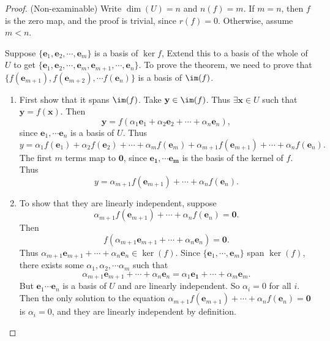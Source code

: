 \documentclass[a4paper]{article}
\begin{document}
\begin{proof}
  (Non-examinable) Write $\dim(U) = n$ and $n(f) = m$. If $m = n$, then $f$ is the zero map, and the proof is trivial, since $r(f) = 0 $. Otherwise, assume $m < n$.

  Suppose $\{\mathbf{e}_1, \mathbf{e}_2,\cdots, \mathbf{e}_m\}$ is a basis of $\ker f$, Extend this to a basis of the whole of $U$ to get $\{\mathbf{e}_1, \mathbf{e}_2, \cdots, \mathbf{e}_m, \mathbf{e}_{m+1}, \cdots, \mathbf{e}_n\}$. To prove the theorem, we need to prove that $\{f(\mathbf{e}_{m+1}), f(\mathbf{e}_{m + 2}), \cdots f({\mathbf{e}_n})\}$ is a basis of $\im (f)$.
  \begin{enumerate}
    \item First show that it spans $\im (f)$. Take $\mathbf{y}\in \im(f)$. Thus $\exists \mathbf{x}\in U$ such that $\mathbf{y} = f(\mathbf{x})$. Then
      \[
        \mathbf{y} = f(\alpha_1\mathbf{e}_1 + \alpha_2\mathbf{e}_2 + \cdots + \alpha_n \mathbf{e}_n),
      \]
      since $\mathbf{e}_1, \cdots \mathbf{e}_n$ is a basis of $U$. Thus
      \[
        y = \alpha_1f(\mathbf{e}_1) + \alpha_2f(\mathbf{e}_2) + \cdots + \alpha_m f(\mathbf{e}_m) + \alpha_{m + 1}f(\mathbf{e}_{m + 1}) + \cdots + \alpha_nf(\mathbf{e}_n).
      \]
      The first $m$ terms map to $\mathbf{0}$, since $\mathbf{e_1, \cdots e_m}$ is the basis of the kernel of $f$. Thus
      \[
        y = \alpha_{m + 1} f(\mathbf{e}_{m + 1}) + \cdots + \alpha_n f(\mathbf{e}_n).
      \]
    \item To show that they are linearly independent, suppose
      \[
        \alpha_{m + 1} f(\mathbf{e}_{m + 1}) + \cdots + \alpha_n f(\mathbf{e}_n) = \mathbf{0}.
      \]
      Then
      \[
        f(\alpha_{m + 1}\mathbf{e}_{m + 1} + \cdots + \alpha_n\mathbf{e}_n) = \mathbf{0}.
      \]
      Thus $\alpha_{m + 1}\mathbf{e}_{m + 1} + \cdots + \alpha_n\mathbf{e}_n\in \ker (f)$. Since $\{\mathbf{e}_1, \cdots, \mathbf{e}_m\}$ span $\ker (f)$, there exists some $\alpha_1, \alpha_2, \cdots \alpha_m$ such that
      \[
        \alpha_{m + 1}\mathbf{e}_{m + 1} + \cdots + \alpha_n\mathbf{e}_n = \alpha_1\mathbf{e_1} + \cdots + \alpha_m\mathbf{e}_m.
      \]
      But $\mathbf{e}_1\cdots \mathbf{e}_n$ is a basis of $U$ and are linearly independent. So $\alpha_i = 0$ for all $i$. Then the only solution to the equation $\alpha_{m + 1} f(\mathbf{e}_{m + 1}) + \cdots + \alpha_n f(\mathbf{e}_n) = \mathbf{0}$ is $\alpha_i = 0$, and they are linearly independent by definition.
  \end{enumerate}
\end{proof}
\end{document}
